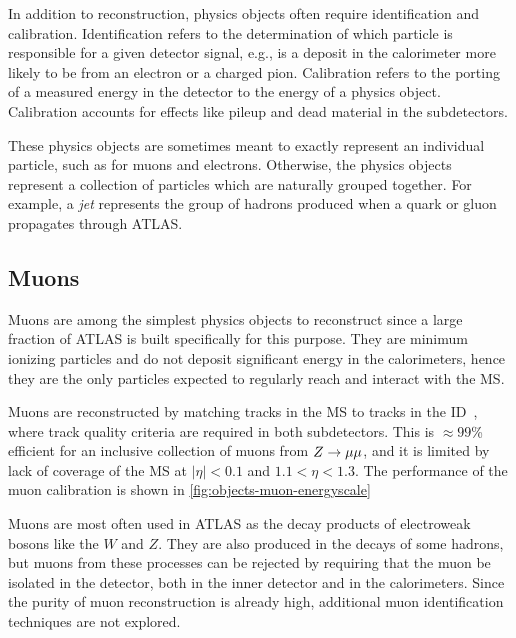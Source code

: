 In addition to reconstruction, physics objects often require identification and calibration. Identification refers to the determination of which particle is responsible for a given detector signal, e.g., is a deposit in the calorimeter more likely to be from an electron or a charged pion. Calibration refers to the porting of a measured energy in the detector to the energy of a physics object. Calibration accounts for effects like pileup and dead material in the subdetectors.

These physics objects are sometimes meant to exactly represent an individual particle, such as for muons and electrons. Otherwise, the physics objects represent a collection of particles which are naturally grouped together. For example, a \textit{jet} represents the group of hadrons produced when a quark or gluon propagates through ATLAS.

\subsection{Muons}

Muons are among the simplest physics objects to reconstruct since a large fraction of ATLAS is built specifically for this purpose. They are minimum ionizing particles and do not deposit significant energy in the calorimeters, hence they are the only particles expected to regularly reach and interact with the MS. 

Muons are reconstructed by matching tracks in the MS to tracks in the ID~\cite{PERF-2014-05}, where track quality criteria are required in both subdetectors. This is $\approx\! 99$\% efficient for an inclusive collection of muons from $Z \rightarrow \mu\mu$, and it is limited by lack of coverage of the MS at $|\eta| < 0.1$ and $1.1 < \eta < 1.3$. The performance of the muon calibration is shown in \cref{fig:objects-muon-energyscale}

Muons are most often used in ATLAS as the decay products of electroweak bosons like the $W$ and $Z$. They are also produced in the decays of some hadrons, but muons from these processes can be rejected by requiring that the muon be isolated in the detector, both in the inner detector and in the calorimeters. Since the purity of muon reconstruction is already high, additional muon identification techniques are not explored.

